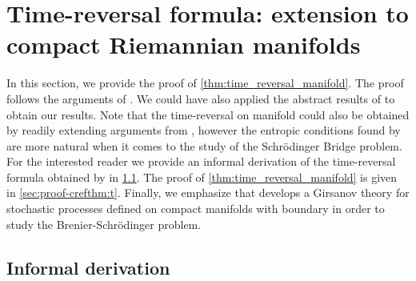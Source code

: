 \section{Time-reversal formula: extension to compact Riemannian manifolds}
\label{sec:time-reversal}

In this section, we  provide the proof of
\cref{thm:time_reversal_manifold}.  The proof follows the arguments of
\citet[Theorem 4.9]{cattiaux2021time}. We could have also applied the abstract
results of \citet[Theorem 5.7]{cattiaux2021time} to obtain our results. Note that
the time-reversal on manifold could also be obtained by readily extending
arguments from \citet{haussmann1986time}, however the entropic conditions found
by \citet{cattiaux2021time} are more natural when it comes to the study of the
Schr\"odinger Bridge problem. For the interested reader we provide an informal
derivation of the time-reversal formula obtained by \citet{haussmann1986time} in
\cref{sec:informal-derivation}. The proof of \cref{thm:time_reversal_manifold}
is given in \cref{sec:proof-crefthm:t}. Finally, we emphasize that
\citet{garcia2021brenier} develops a Girsanov theory for stochastic processes
defined on compact manifolds with boundary in order to study the
Brenier-Schr\"odinger problem.

\subsection{Informal derivation}
\label{sec:informal-derivation}

